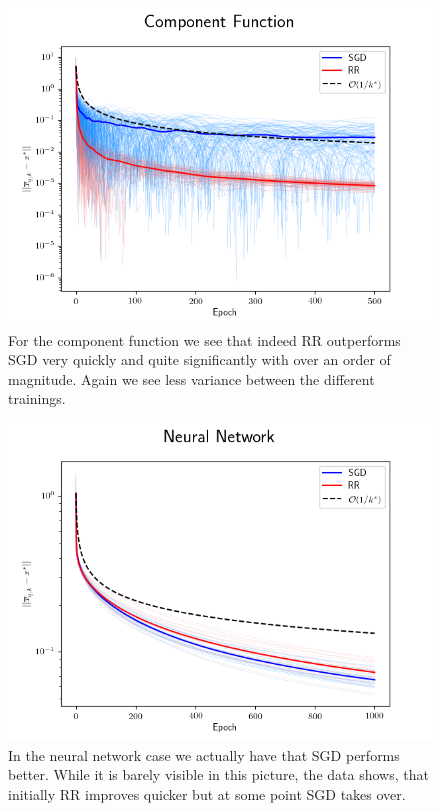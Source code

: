 \documentclass[10pt,conference,compsocconf]{IEEEtran}
\begin{document}
\begin{figure}[h]
  \centering
  \includegraphics[width=\columnwidth]{Component_Function_run}
  \caption{For the component function we see that indeed RR outperforms SGD very quickly and quite significantly with over an order of magnitude. Again we see less variance between the different trainings.}
  \vspace{-3mm}
  \label{fig:component1}
\end{figure}

\begin{figure}[h]
	\centering
	\includegraphics[width=\columnwidth]{Neural_Network_run}
	\caption{In the neural network case we actually have that SGD performs better. While it is barely visible in this picture, the data shows, that initially RR improves quicker but at some point SGD takes over. }
	\vspace{-3mm}
	\label{fig:nonconvex1}
\end{figure}
\end{document}
